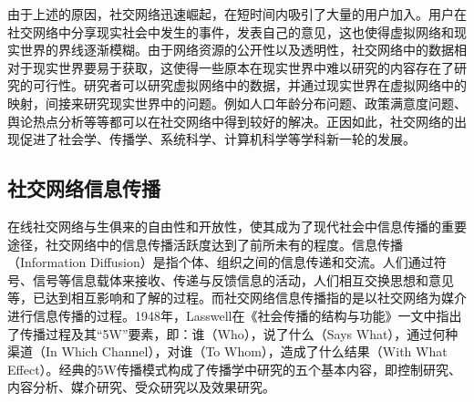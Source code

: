 由于上述的原因，社交网络迅速崛起，在短时间内吸引了大量的用户加入。用户在社交网络中分享现实社会中发生的事件，发表自己的意见，这也使得虚拟网络和现实世界的界线逐渐模糊。由于网络资源的公开性以及透明性，社交网络中的数据相对于现实世界要易于获取，这使得一些原本在现实世界中难以研究的内容存在了研究的可行性。研究者可以研究虚拟网络中的数据，并通过现实世界在虚拟网络中的映射，间接来研究现实世界中的问题。例如人口年龄分布问题、政策满意度问题、舆论热点分析等等都可以在社交网络中得到较好的解决。正因如此，社交网络的出现促进了社会学、传播学、系统科学、计算机科学等学科新一轮的发展。

\subsection{社交网络信息传播}
\label{subsec1:informationDiffusion}
在线社交网络与生俱来的自由性和开放性，使其成为了现代社会中信息传播的重要途径，社交网络中的信息传播活跃度达到了前所未有的程度。信息传播（Information Diffusion）是指个体、组织之间的信息传递和交流。人们通过符号、信号等信息载体来接收、传递与反馈信息的活动，人们相互交换思想和意见等，已达到相互影响和了解的过程。而社交网络信息传播指的是以社交网络为媒介进行信息传播的过程。1948年，Lasswell在《社会传播的结构与功能》一文中指出了传播过程及其“5W”要素，即：谁（Who），说了什么（Says What），通过何种渠道（In Which Channel），对谁（To Whom），造成了什么结果（With What Effect）。经典的5W传播模式构成了传播学中研究的五个基本内容，即控制研究、内容分析、媒介研究、受众研究以及效果研究。

